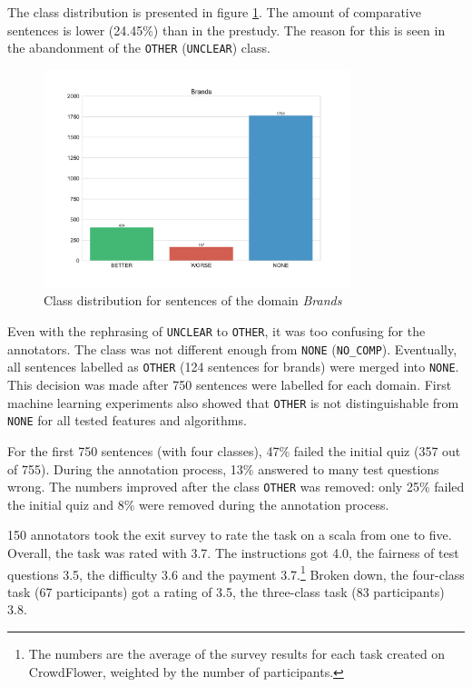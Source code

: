 The class distribution is presented in figure \ref{fig:brands_fin}. The amount of comparative sentences is lower (24.45\%) than in the prestudy. The reason for this is seen in the abandonment of the \texttt{OTHER} (\texttt{UNCLEAR}) class. 

\begin{figure}[h]
\centering
\caption{Class distribution for sentences of the domain \emph{Brands}}
\label{fig:brands_fin}
\includegraphics[width=0.8\textwidth]{images/dataset/Brands-dist}
\end{figure}




Even with the rephrasing of \texttt{UNCLEAR} to \texttt{OTHER}, it was too confusing for the annotators. The class was not different enough from \texttt{NONE} (\texttt{NO\_COMP}). Eventually, all sentences labelled as \texttt{OTHER} (124 sentences for brands) were merged into \texttt{NONE}. This decision was made after 750 sentences were labelled for each domain. First machine learning experiments also showed that \texttt{OTHER} is not distinguishable from \texttt{NONE} for all tested features and algorithms.

For the first 750 sentences (with four classes), 47\% failed the initial quiz (357 out of 755). During the annotation process, 13\% answered to many test questions wrong. The numbers improved after the class \texttt{OTHER} was removed: only 25\% failed the initial quiz and 8\% were removed during the annotation process.

150 annotators took the exit survey to rate the task on a scala from one to five. Overall, the task was rated with 3.7. The instructions got 4.0, the fairness of test questions 3.5, the difficulty 3.6 and the payment 3.7.\footnote{The numbers are the average of the survey results for each task created on CrowdFlower, weighted by the number of participants.} Broken down, the four-class task (67 participants) got a rating of 3.5, the three-class task (83 participants) 3.8.


